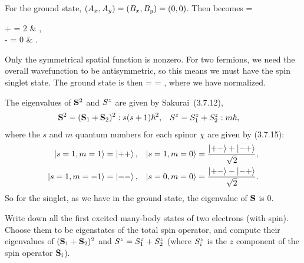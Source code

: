 \begin{solution}
	For the ground state, $(A_x, A_y) = (B_x, B_y) = (0, 0)$.  Then  becomes
	\beq
		\kphi =  \begin{cases}
			\ket{0 0}  +   = 2   & , \\
			\ket{0 0}  -   = 0 & .
		\end{cases}
	\eeq
	Only the symmetrical spatial function is nonzero.  For two fermions, we need the overall wavefunction to be antisymmetric, so this means we must have the spin singlet state.  The ground state is then
	\beq
		\kpsi = \ket{\nxq, \nxw} \ket{\nyq, \nyw} \ket{\sq, \sw}
		= ,
	\eeq
	where we have normalized.
	
	The eigenvalues of $\vb{S}^2$ and $S^z$ are given by Sakurai~(3.7.12),
	\begin{align} \label{eigen}
		\vb{S}^2 = (\vb{S}_1 + \vb{S}_2)^2 &: s(s + 1) \hbar^2, &
		S^z = S^z_1 + S^z_2 &: m \hbar,
	\end{align}
	where the $s$ and $m$ quantum numbers for each spinor $\chi$ are given by (3.7.15):
	\begin{align}
		\ket{s=1, m=1} &= \ket{+ +}, &
		\ket{s=1, m=0} &= \frac{\ket{+ -} + \ket{- +}}{\sqrt{2}}, \notag \\
		\ket{s=1, m=-1} &= \ket{- -}, &
		\ket{s=0, m=0} &= \frac{\ket{+ -} - \ket{- +}}{\sqrt{2}}. \label{sm}
	\end{align}
	So for the singlet, as we have in the ground state, the eigenvalue of $\vb{S}$ is 0.
\end{solution}


\newcommand{\fq}{f_1}
\newcommand{\gq}{g_1}

\clearpage
\begin{problem}
	Write down all the first excited many-body states of two electrons (with spin).  Choose them to be eigenstates of the total spin operator, and compute their eigenvalues of $(\vb{S}_1 + \vb{S}_2)^2$ and $S^z = S^z_1 + S^z_2$ (where $S^z_i$ is the $z$ component of the spin operator $\vb{S}_i$).
\end{problem}

